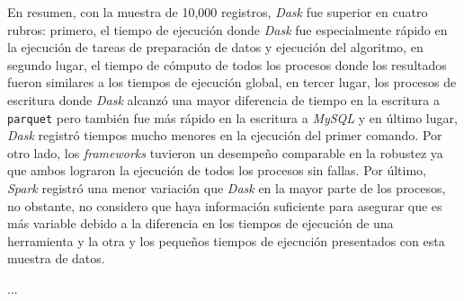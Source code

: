 En resumen, con la muestra de 10,000 registros, \textit{Dask} fue superior en cuatro rubros: primero, el tiempo de ejecución donde \textit{Dask} fue especialmente rápido en la ejecución de tareas de preparación de datos y ejecución del algoritmo, en segundo lugar, el tiempo de cómputo de todos los procesos donde los resultados fueron similares a los tiempos de ejecución global, en tercer lugar, los procesos de escritura donde \textit{Dask} alcanzó una mayor diferencia de tiempo en la escritura a \texttt{parquet} pero también fue más rápido en la escritura a \textit{MySQL} y en último lugar, \textit{Dask} registró tiempos mucho menores en la ejecución del primer comando. Por otro lado, los \textit{frameworks} tuvieron un desempeño comparable en la robustez ya que ambos lograron la ejecución de todos los procesos sin fallas. Por último, \textit{Spark} registró una menor variación que \textit{Dask} en la mayor parte de los procesos, no obstante, no considero que haya información suficiente para asegurar que es más variable debido a la diferencia en los tiempos de ejecución de una herramienta y la otra y los pequeños tiempos de ejecución presentados con esta muestra de datos.



\noindent ...

